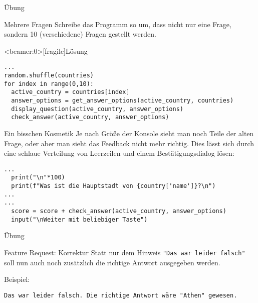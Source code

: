 \begin{frame}{Übung}
\begin{block}{Mehrere Fragen}
\vspace{2pt}
Schreibe das Programm so um, dass nicht nur eine Frage, sondern 10 (verschiedene) Fragen gestellt werden. 
\end{block}
\end{frame}



\begin{frame}<beamer:0>[fragile]{Lösung}
	
\begin{solutionblock}{}
\begin{verbatim}
...
random.shuffle(countries)
for index in range(0,10):
  active_country = countries[index]
  answer_options = get_answer_options(active_country, countries)
  display_question(active_country, answer_options)
  check_answer(active_country, answer_options)
\end{verbatim}
\end{solutionblock}
\end{frame}


\begin{fragile}
\begin{block}{Ein bisschen Kosmetik}
\vspace{2pt}
Je nach Größe der Konsole sieht man noch Teile der alten Frage, oder aber man sieht das Feedback nicht mehr richtig. 
Dies lässt sich durch eine schlaue Verteilung von Leerzeilen und einem Bestätigungsdialog lösen: 

\begin{verbatim}
...
  print("\n"*100)
  print(f"Was ist die Hauptstadt von {country['name']}?\n")
...
...
  score = score + check_answer(active_country, answer_options)
  input("\nWeiter mit beliebiger Taste")
\end{verbatim}

\end{block}
\end{fragile}


\begin{frame}{Übung}
\begin{block}{Feature Request: Korrektur}
\vspace{2pt}
Statt nur dem Hinweis \texttt{"Das war leider falsch"} soll nun auch noch zusätzlich die richtige Antwort ausgegeben werden. 
\vspace{2pt}

Beispiel: 

\texttt{Das war leider falsch. Die richtige Antwort wäre "{}Athen"{} gewesen.} 
\end{block}
\end{frame}


